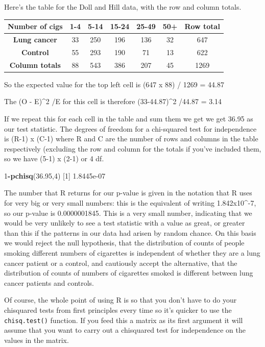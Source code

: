 \documentclass[
]{book}
\newenvironment{Shaded}{\begin{snugshade}}{\end{snugshade}}
\newcommand{\DecValTok}[1]{\textcolor[rgb]{0.00,0.00,0.81}{#1}}
\newcommand{\FloatTok}[1]{\textcolor[rgb]{0.00,0.00,0.81}{#1}}
\newcommand{\KeywordTok}[1]{\textcolor[rgb]{0.13,0.29,0.53}{\textbf{#1}}}
\newcommand{\NormalTok}[1]{#1}
\newcommand{\OperatorTok}[1]{\textcolor[rgb]{0.81,0.36,0.00}{\textbf{#1}}}
\begin{document}
Here's the table for the Doll and Hill data, with the row and column totals.

\begin{longtable}[]{@{}ccccccc@{}}
\toprule
Number of cigs & 1-4 & 5-14 & 15-24 & 25-49 & 50+ & Row total\tabularnewline
\midrule
\endhead
\textbf{Lung cancer} & 33 & 250 & 196 & 136 & 32 & 647\tabularnewline
\textbf{Control} & 55 & 293 & 190 & 71 & 13 & 622\tabularnewline
\textbf{Column totals} & 88 & 543 & 386 & 207 & 45 & 1269\tabularnewline
\bottomrule
\end{longtable}

So the expected value for the top left cell is (647 x 88) / 1269 = 44.87

The (O - E)\^{}2 /E for this cell is therefore (33-44.87)\^{}2 /44.87 = 3.14

If we repeat this for each cell in the table and sum them we get we get 36.95 as our test statistic. The degrees of freedom for a chi-squared test for independence is (R-1) x (C-1) where R and C are the number of rows and columns in the table respectively (excluding the row and column for the totals if you've included them, so we have (5-1) x (2-1) or 4 df.

\begin{Shaded}
\begin{Highlighting}[]
\DecValTok{1}\OperatorTok{-}\KeywordTok{pchisq}\NormalTok{(}\FloatTok{36.95}\NormalTok{,}\DecValTok{4}\NormalTok{)}
\NormalTok{[}\DecValTok{1}\NormalTok{] }\FloatTok{1.8445e-07}
\end{Highlighting}
\end{Shaded}

The number that R returns for our p-value is given in the notation that R uses for very big or very small numbers: this is the equivalent of writing 1.842x10\^{}-7, so our p-value is 0.0000001845. This is a very small number, indicating that we would be very unlikely to see a test statistic with a value as great, or greater than this if the patterns in our data had arisen by random chance. On this basis we would reject the null hypothesis, that the distribution of counts of people smoking different numbers of cigarettes is independent of whether they are a lung cancer patient or a control, and cautiously accept the alternative, that the distribution of counts of numbers of cigarettes smoked is different between lung cancer patients and controls.

Of course, the whole point of using R is so that you don't have to do your chisquared tests from first principles every time so it's quicker to use the \texttt{chisq.test()} function. If you feed this a matrix as its first argument it will assume that you want to carry out a chisquared test for independence on the values in the matrix.
\end{document}
